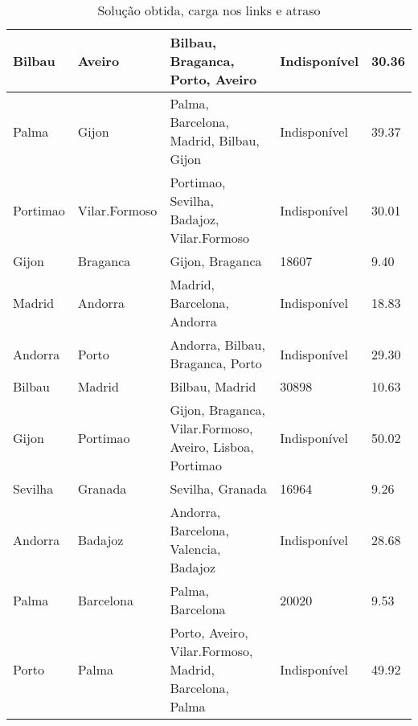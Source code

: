 \begin{table}[!htb]
{\begin{tabular}{|l|l|l|l|l|}
Bilbau & Aveiro & Bilbau, Braganca, Porto, Aveiro & Indisponível & 30.36 \\ \hline
Palma & Gijon & Palma, Barcelona, Madrid, Bilbau, Gijon & Indisponível & 39.37 \\ \hline
Portimao & Vilar.Formoso & Portimao, Sevilha, Badajoz, Vilar.Formoso & Indisponível & 30.01 \\ \hline
Gijon & Braganca & Gijon, Braganca & 18607 & 9.40 \\ \hline
Madrid & Andorra & Madrid, Barcelona, Andorra & Indisponível & 18.83 \\ \hline
Andorra & Porto & Andorra, Bilbau, Braganca, Porto & Indisponível & 29.30 \\ \hline
Bilbau & Madrid & Bilbau, Madrid & 30898 & 10.63 \\ \hline
Gijon & Portimao & Gijon, Braganca, Vilar.Formoso, Aveiro, Lisboa, Portimao & Indisponível & 50.02 \\ \hline
Sevilha & Granada & Sevilha, Granada & 16964 & 9.26 \\ \hline
Andorra & Badajoz & Andorra, Barcelona, Valencia, Badajoz & Indisponível & 28.68 \\ \hline
Palma & Barcelona & Palma, Barcelona & 20020 & 9.53 \\ \hline
Porto & Palma & Porto, Aveiro, Vilar.Formoso, Madrid, Barcelona, Palma & Indisponível & 49.92 \\ \hline
\end{tabular}}
\caption[]{Solução obtida, carga nos links e atraso}
\end{table}

